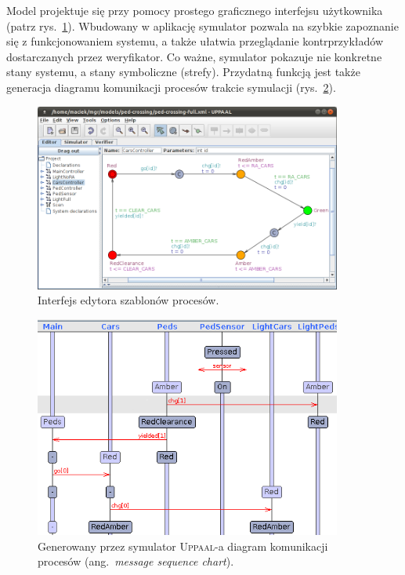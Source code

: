 \documentclass{pracamgr}
\newcommand{\ang}[1]{(ang.~\emph{#1})}
\newcommand{\upp}{\textsc{Uppaal}}
\theoremstyle{plain}
\begin{document}
Model projektuje się przy pomocy prostego graficznego interfejsu
użytkownika (patrz rys.~\ref{img:uppaal-gui}). Wbudowany w aplikację
symulator pozwala na szybkie zapoznanie się z funkcjonowaniem systemu,
a także ułatwia przeglądanie kontrprzykładów dostarczanych przez
weryfikator. Co ważne, symulator pokazuje nie konkretne stany systemu,
a stany symboliczne (strefy). Przydatną funkcją jest także generacja
diagramu komunikacji procesów trakcie symulacji
(rys.~\ref{img:uppaal-msc}).
\begin{figure}[ht]
  \centering
  \includegraphics[width=0.9\textwidth]{img/uppaal-editor.png}
  \caption{Interfejs edytora szablonów procesów.}
  \label{img:uppaal-gui}
\end{figure}

\begin{figure}[ht]
  \centering
  \includegraphics[width=0.9\textwidth]{img/uppaal-msc.png}
  \caption{Generowany przez symulator \upp-a diagram komunikacji
    procesów \ang{message sequence chart}.}
  \label{img:uppaal-msc}
\end{figure}
\end{document}

